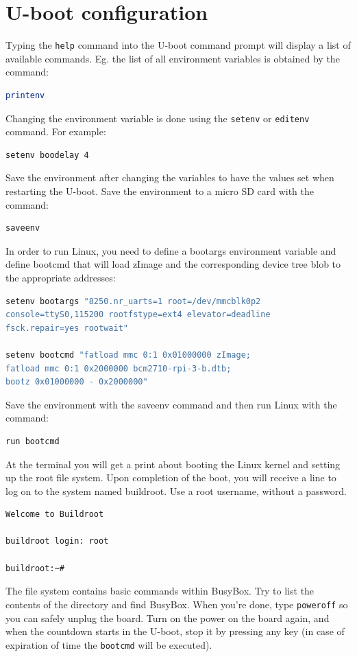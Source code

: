 \documentclass[11pt]{article}
\begin{document}
\section{U-boot configuration}
Typing the \texttt{help} command into the U-boot command prompt will display a
 list of available commands. Eg. the list of all environment variables is
 obtained by the command:
\begin{lstlisting}[language=bash]
printenv
\end{lstlisting}
Changing the environment variable is done using the \texttt{setenv} or
 \texttt{editenv} command. For example:
\begin{lstlisting}[language=bash]
setenv boodelay 4
\end{lstlisting}
Save the environment after changing the variables to have the values set when
 restarting the U-boot. Save the environment to a micro SD card with the
 command:
\begin{lstlisting}[language=bash]
saveenv
\end{lstlisting}
In order to run Linux, you need to define a bootargs environment variable and
 define bootcmd that will load zImage and the corresponding device tree blob to
 the appropriate addresses:
\begin{lstlisting}[language=bash]
setenv bootargs "8250.nr_uarts=1 root=/dev/mmcblk0p2
console=ttyS0,115200 rootfstype=ext4 elevator=deadline
fsck.repair=yes rootwait"

setenv bootcmd "fatload mmc 0:1 0x01000000 zImage;
fatload mmc 0:1 0x2000000 bcm2710-rpi-3-b.dtb;
bootz 0x01000000 - 0x2000000"
\end{lstlisting}
Save the environment with the saveenv command and then run Linux with the
 command:
\begin{lstlisting}[language=bash]
run bootcmd
\end{lstlisting}
At the terminal you will get a print about booting the Linux kernel and setting
 up the root file system. Upon completion of the boot, you will receive a line
 to log on to the system named buildroot. Use a root username, without a
 password.
\begin{lstlisting}[language=bash]
Welcome to Buildroot

buildroot login: root

buildroot:~#
\end{lstlisting}
The file system contains basic commands within BusyBox. Try to list the
 contents of the directory and find BusyBox. When you're done, type
 \texttt{poweroff} so you can safely unplug the board. Turn on the power on the
 board again, and when the countdown starts in the U-boot, stop it by pressing
 any key (in case of expiration of time the \texttt{bootcmd} will be
 executed).
\end{document}
